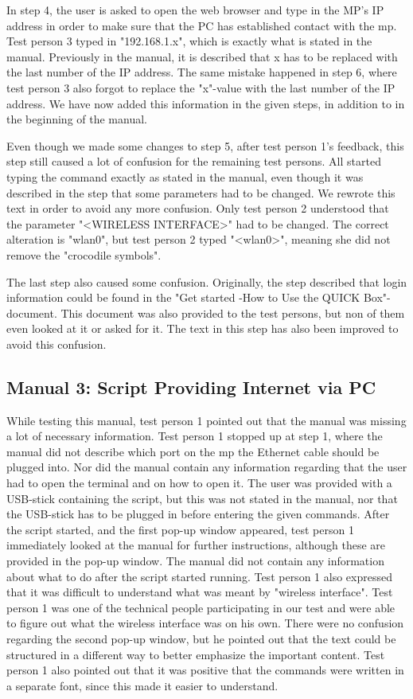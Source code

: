 In step 4, the user is asked to open the web browser and type in the MP's IP address in order to make sure that the PC has established contact with the \gls{mp}. Test person 3 typed in "192.168.1.x", which is exactly what is stated in the manual. Previously in the manual, it is described that x has to be replaced with the last number of the IP address. The same mistake happened in step 6, where test person 3 also forgot to replace the "x"-value with the last number of the IP address. We have now added this information in the given steps, in addition to in the beginning of the manual. 

Even though we made some changes to step 5, after test person 1's feedback, this step still caused a lot of confusion for the remaining test persons. All started typing the command exactly as stated in the manual, even though it was described in the step that some parameters had to be changed. We rewrote this text in order to avoid any more confusion. Only test person 2 understood that the parameter "<WIRELESS INTERFACE>" had to be changed. The correct alteration is "wlan0", but test person 2 typed "<wlan0>", meaning she did not remove the "crocodile symbols".

The last step also caused some confusion. Originally, the step described that login information could be found in the "Get started -How to Use the QUICK Box"-document. This document was also provided to the test persons, but non of them even looked at it or asked for it. The text in this step has also been improved to avoid this confusion.

\subsection{Manual 3: Script Providing Internet via PC}
While testing this manual, test person 1 pointed out that the manual was missing a lot of necessary information. Test person 1 stopped up at step 1, where the manual did not describe which port on the \gls{mp} the Ethernet cable should be plugged into. Nor did the manual contain any information regarding that the user had to open the terminal and on how to open it. The user was provided with a USB-stick containing the script, but this was not stated in the manual, nor that the USB-stick has to be plugged in before entering the given commands. After the script started, and the first pop-up window appeared, test person 1 immediately looked at the manual for further instructions, although these are provided in the pop-up window. The manual did not contain any information about what to do after the script started running. Test person 1 also expressed that it was difficult to understand what was meant by "wireless interface". Test person 1 was one of the technical people participating in our test and were able to figure out what the wireless interface was on his own. There were no confusion regarding the second pop-up window, but he pointed out that the text could be structured in a different way to better emphasize the important content.
Test person 1 also pointed out that it was positive that the commands were written in a separate font, since this made it easier to understand. 


